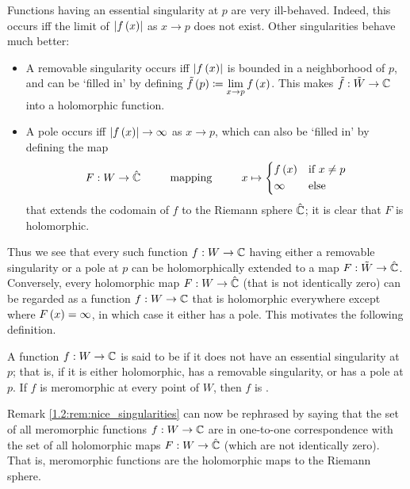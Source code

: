 \documentclass[../Moduli_Spaces_of_Riemann_Surfaces.tex]{subfiles}
\begin{document}
    \begin{remark}\label{1.2:rem:nice_singularities}
        Functions having an essential singularity at $p$ are very ill-behaved. Indeed, this occurs iff the limit of $\left|f\left(x\right)\right|$ as $x\to p$ does not exist. Other singularities behave much better:
        \begin{itemize}
            \item A removable singularity occurs iff $\left|f\left(x\right)\right|$ is bounded in a neighborhood of $p$, and can be $\textrm{`}$filled in$\textrm{'}$ by defining $\tilde{f}\left(p\right)\coloneqq\lim\limits_{x\to p}f\left(x\right)$. This makes $\tilde{f}:\tilde{W}\to\mathbb{C}$ into a holomorphic function.
            \vspace{-0.08in}
            \item A pole occurs iff $\left|f\left(x\right)\right|\to\infty$ as $x\to p$, which can also be $\textrm{`}$filled in$\textrm{'}$ by defining the map
                \begin{equation*}
                    F:W\to\RS\ \ \ \ \ \ \ \ \textrm{mapping}\ \ \ \ \ \ \ \ x\mapsto
                    \begin{dcases}
                        f\l(x\r) & \textrm{if }x\neq p \\
                        \infty & \textrm{else}
                    \end{dcases}
                \end{equation*}
                that extends the codomain of $f$ to the Riemann sphere $\hat{\mathbb{C}}$; it is clear that $F$ is holomorphic.
        \end{itemize}
        Thus we see that every such function $f:W\to\mathbb{C}$ having either a removable singularity or a pole at $p$ can be holomorphically extended to a map $F:\tilde{W}\to\hat{\mathbb{C}}$. Conversely, every holomorphic map $F:W\to\hat{\mathbb{C}}$ (that is not identically zero) can be regarded as a function $f:W\to\mathbb{C}$ that is holomorphic everywhere except where $F\left(x\right)=\infty$, in which case it either has a pole. This motivates the following definition.\exqed
    \end{remark}
    \begin{definition}
        A function $f:W\to\mathbb{C}$ is said to be  if it does not have an essential singularity at $p$; that is, if it is either holomorphic, has a removable singularity, or has a pole at $p$. If $f$ is meromorphic at every point of $W$, then $f$ is .
    \end{definition}
    \begin{remark}
        Remark \ref{1.2:rem:nice_singularities} can now be rephrased by saying that the set of all meromorphic functions $f:W\to\mathbb{C}$ are in one-to-one correspondence with the set of all holomorphic maps $F:W\to\hat{\mathbb{C}}$ (which are not identically zero). That is, meromorphic functions are the holomorphic maps to the Riemann sphere.\exqed
    \end{remark}
\end{document}
